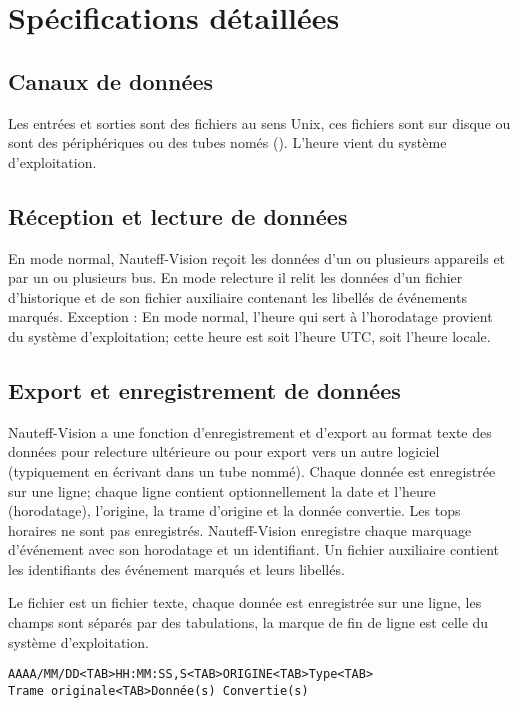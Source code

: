 \documentclass[a4paper,11pt]{report}
\begin{document}
\chapter{Spécifications détaillées}

\section{Canaux de données}

Les entrées et sorties sont des fichiers au sens Unix, ces fichiers
sont sur disque ou sont des périphériques ou des tubes només ().
L'heure vient du système d'exploitation.


\section{Réception et lecture de données}

En mode normal, Nauteff-Vision reçoit les données d'un ou plusieurs appareils et par un ou plusieurs bus.
En mode relecture il relit les données d'un fichier d'historique et de son fichier auxiliaire
contenant les libellés de événements marqués.
Exception : En mode normal, l'heure qui sert à l'horodatage provient du système d'exploitation;
cette heure est soit l'heure UTC, soit l'heure locale.

\section{Export et enregistrement de données}

Nauteff-Vision a une fonction d'enregistrement et d'export
au format texte des données pour relecture ultérieure 
ou pour export vers un autre logiciel
(typiquement en écrivant dans un tube nommé).
Chaque donnée est enregistrée sur une ligne;
chaque ligne contient optionnellement la date et l'heure (horodatage),
l'origine, la trame d'origine et la donnée convertie.
Les tops horaires ne sont pas enregistrés.
Nauteff-Vision enregistre chaque marquage d'événement avec son horodatage et un identifiant.
Un fichier auxiliaire contient les identifiants des événement
marqués et leurs libellés.


Le fichier est un fichier texte, chaque donnée est enregistrée sur une ligne,
les champs sont séparés par des tabulations,
la marque de fin de ligne est celle du système d'exploitation.

\begin{verbatim}
AAAA/MM/DD<TAB>HH:MM:SS,S<TAB>ORIGINE<TAB>Type<TAB>
Trame originale<TAB>Donnée(s) Convertie(s)
\end{verbatim}
\end{document}
